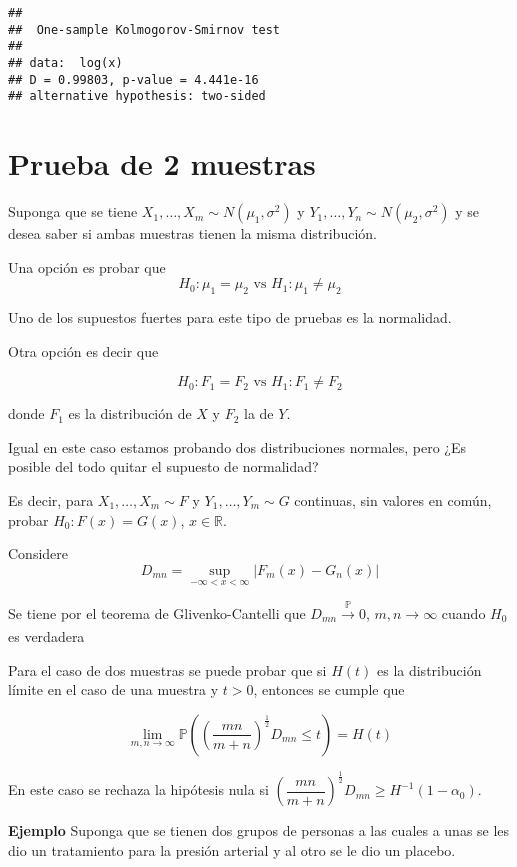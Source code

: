\documentclass[
  12pt,
]{book}
\begin{document}
\begin{verbatim}
## 
##  One-sample Kolmogorov-Smirnov test
## 
## data:  log(x)
## D = 0.99803, p-value = 4.441e-16
## alternative hypothesis: two-sided
\end{verbatim}

\hypertarget{prueba-de-2-muestras}{%
\section{Prueba de 2 muestras}\label{prueba-de-2-muestras}}

Suponga que se tiene \(X_1,\dots,X_m\sim N(\mu_1,\sigma^2)\) y
\(Y_1,\dots,Y_n\sim N(\mu_2,\sigma^2)\) y se desea saber si ambas muestras tienen
la misma distribución.

Una opción es probar que
\[
H_0:\mu_1 = \mu_2 \text{ vs  } H_1: \mu_{1} \neq \mu_{2} 
\]

Uno de los supuestos fuertes para este tipo de pruebas es la normalidad.

Otra opción es decir que

\[
H_0: F_1 = F_2 \text{ vs  } H_1: F_{1} \neq F_{2}
\]

donde \(F_1\) es la distribución de \(X\) y \(F_2\) la de \(Y\).

Igual en este caso estamos probando dos distribuciones normales, pero ¿Es
posible del todo quitar el supuesto de normalidad?

Es decir, para \(X_1,\dots,X_m\sim F\) y \(Y_1,\dots,Y_m\sim G\) continuas, sin
valores en común, probar \(H_0: F(x) = G(x)\), \(x \in \mathbb R\).

Considere
\[
D_{mn} = \sup_{-\infty<x<\infty}|F_m(x)-G_n(x)|
\]

Se tiene por el teorema de Glivenko-Cantelli que \(D_{mn}\xrightarrow[]{\mathbb P} 0\), \(m,n\to\infty\) cuando \(H_0\) es verdadera

Para el caso de dos muestras se puede probar que si \(H(t)\) es la distribución
límite en el caso de una muestra y \(t>0\), entonces se cumple que

\[\lim_{m,n\to \infty} \mathbb P \left( \left( \dfrac{mn}{m+n}\right)^{\frac 12} D_{mn}\leq t\right) = H(t)\]

En este caso se rechaza la hipótesis nula si
\(\left(\dfrac{mn}{m+n}\right)^{\frac 12}D_{mn} \geq H^{-1}(1-\alpha_0)\).

\textbf{Ejemplo} Suponga que se tienen dos grupos de personas a las cuales a unas se
les dio un tratamiento para la presión arterial y al otro se le dio un placebo.
\end{document}
